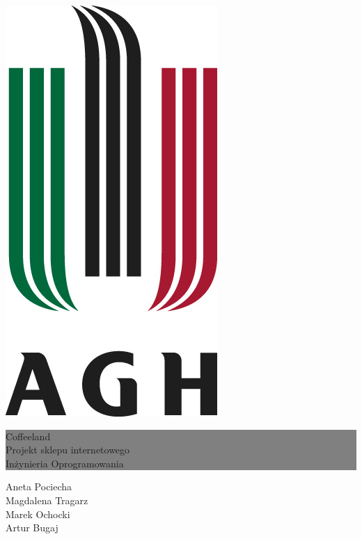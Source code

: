 \documentclass[10pt]{report}
\begin{document}
	
	\begin{titlepage} 
		
		\begin{center}
			\includegraphics[scale=0.4]{agh.jpg}
		\end{center}

		\vfill
			\colorbox{grey}{
				\parbox[t]{0.93\textwidth}{
					\parbox[t]{0.91\textwidth}{
						\raggedleft
						\fontsize{50pt}{80pt}\selectfont
						\vspace{0.7cm}
						Coffeeland\\
						\fontsize{20pt}{50pt}\selectfont
						Projekt sklepu internetowego\\
						\fontsize{15pt}{30pt}\selectfont
						Inżynieria Oprogramowania\\
						\vspace{0.7cm}
				}
			}
		}
	
		\vfill
		\parbox[t]{0.93\textwidth}{
			\raggedleft
			\large
			{\Large Aneta Pociecha}\\[4pt]
			{\Large Magdalena Tragarz}\\[4pt]
			{\Large Marek Ochocki}\\[4pt]
			{\Large Artur Bugaj}\\[4pt]
		}
		
	\end{titlepage}
	
\end{document}
